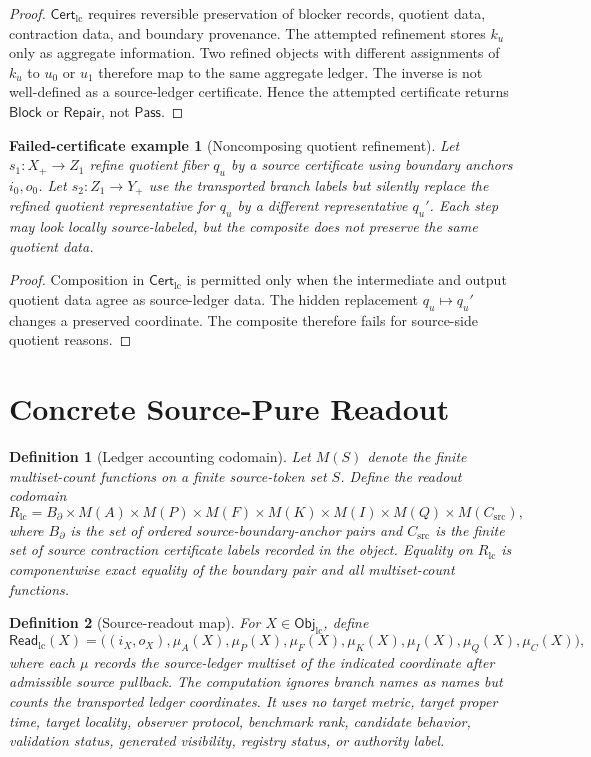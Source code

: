 \documentclass[11pt]{article}
\newcommand{\ObjLC}{\mathsf{Obj}_{\mathrm{lc}}}
\newcommand{\CertLC}{\mathsf{Cert}_{\mathrm{lc}}}
\newcommand{\ReadLC}{\mathsf{Read}_{\mathrm{lc}}}
\newcommand{\Pass}{\mathsf{Pass}}
\newcommand{\Block}{\mathsf{Block}}
\newcommand{\Repair}{\mathsf{Repair}}
\newtheorem{definition}{Definition}
\newtheorem{failedcase}{Failed-certificate example}
\begin{document}
\begin{proof}
\(\CertLC\) requires reversible preservation of blocker records,
quotient data, contraction data, and boundary provenance. The attempted
refinement stores \(k_u\) only as aggregate information. Two refined
objects with different assignments of \(k_u\) to \(u_0\) or \(u_1\)
therefore map to the same aggregate ledger. The inverse is not
well-defined as a source-ledger certificate. Hence the attempted
certificate returns \(\Block\) or \(\Repair\), not \(\Pass\).
\end{proof}

\begin{failedcase}[Noncomposing quotient refinement]
Let \(s_1:X_+\to Z_1\) refine quotient fiber \(q_u\) by a source
certificate using boundary anchors \(i_0,o_0\). Let \(s_2:Z_1\to Y_+\)
use the transported branch labels but silently replace the refined
quotient representative for \(q_u\) by a different representative
\(q_u'\). Each step may look locally source-labeled, but the composite
does not preserve the same quotient data.
\end{failedcase}

\begin{proof}
Composition in \(\CertLC\) is permitted only when the intermediate and
output quotient data agree as source-ledger data. The hidden
replacement \(q_u\mapsto q_u'\) changes a preserved coordinate. The
composite therefore fails for source-side quotient reasons.
\end{proof}

\section{Concrete Source-Pure Readout}

\begin{definition}[Ledger accounting codomain]
Let \(M(S)\) denote the finite multiset-count functions on a finite
source-token set \(S\). Define the readout codomain
\[
    R_{\mathrm{lc}} =
    B_{\partial}\times M(A)\times M(P)\times M(F)\times
    M(K)\times M(I)\times M(Q)\times M(C_{\mathrm{src}}),
\]
where \(B_{\partial}\) is the set of ordered source-boundary-anchor
pairs and \(C_{\mathrm{src}}\) is the finite set of source contraction
certificate labels recorded in the object. Equality on
\(R_{\mathrm{lc}}\) is componentwise exact equality of the boundary
pair and all multiset-count functions.
\end{definition}

\begin{definition}[Source-readout map]
For \(X\in\ObjLC\), define
\[
    \ReadLC(X)=
    \bigl(
    (i_X,o_X),
    \mu_A(X),
    \mu_P(X),
    \mu_F(X),
    \mu_K(X),
    \mu_I(X),
    \mu_Q(X),
    \mu_C(X)
    \bigr),
\]
where each \(\mu\) records the source-ledger multiset of the indicated
coordinate after admissible source pullback. The computation ignores
branch names as names but counts the transported ledger coordinates.
It uses no target metric, target proper time, target locality,
observer protocol, benchmark rank, candidate behavior, validation
status, generated visibility, registry status, or authority label.
\end{definition}
\end{document}
